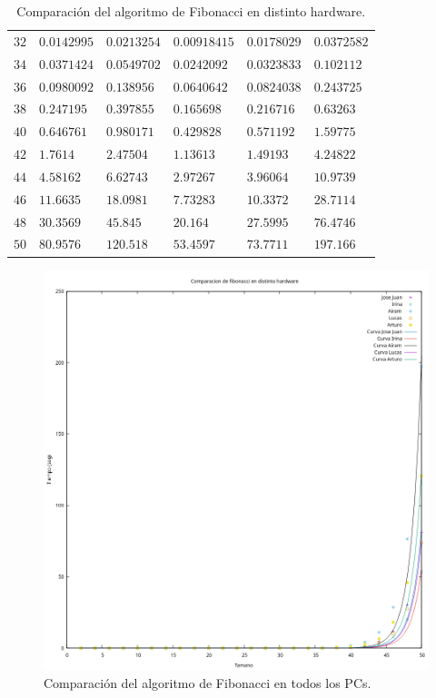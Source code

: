 \documentclass[12pt]{article}
\begin{document}
\begin{table}
\begin{tabular}{|l|l|l|l|l|l|}
            $32$ & $0.0142995$ & $0.0213254$ & $0.00918415$ & $0.0178029$ & $0.0372582$ \\
            $34$ & $0.0371424$ & $0.0549702$ & $0.0242092$ & $0.0323833$ & $0.102112$ \\
            $36$ & $0.0980092$ & $0.138956$ & $0.0640642$ & $0.0824038$ & $0.243725$ \\
            $38$ & $0.247195$ & $0.397855$ & $0.165698$ & $0.216716$ & $0.63263$ \\
            $40$ & $0.646761$ & $0.980171$ & $0.429828$ & $0.571192$ & $1.59775$ \\
            $42$ & $1.7614$ & $2.47504$ & $1.13613$ & $1.49193$ & $4.24822$ \\
            $44$ & $4.58162$ & $6.62743$ & \underline{$2.97267$} & $3.96064$ & \underline{$10.9739$} \\
            $46$ & $11.6635$ & $18.0981$ & $7.73283$ & $10.3372$ & $28.7114$ \\
            $48$ & $30.3569$ & $45.845$ & $20.164$ & $27.5995$ & $76.4746$ \\
            $50$ & $80.9576$ & $120.518$ & $53.4597$ & $73.7711$ & $197.166$ \\
            \hline
        \end{tabular}
        \caption{Comparación del algoritmo de Fibonacci en distinto hardware.}
        \label{tab:comp_hardware_fibonacci}
    \end{table}
    \begin{figure}
        \centering
        \includegraphics[width=\linewidth]{images/Comparaciones_hardware/Comparacion_hardware_fibonacci.png}
        \caption{Comparación del algoritmo de Fibonacci en todos los PCs.}
        \label{fig:CompHardwareFibonacci}
    \end{figure}
\end{document}
